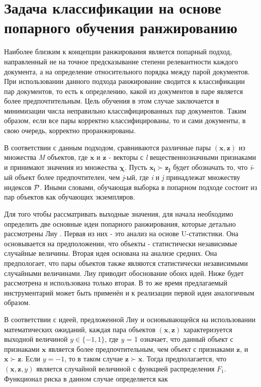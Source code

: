 \documentclass[12pt,a4paper,oneside]{article}
\begin{document}
\section{Задача классификации на основе попарного обучения ранжированию}
\label{sec:pairwise_rank_learning_problem}

\par
Наиболее близким к концепции ранжирования является попарный подход, направленный не на точное предсказывание степени релевантности каждого документа, а на определение относительного порядка между парой документов. 
При использовании данного подхода ранжирование сводится к классификации пар документов, то есть к определению, какой из документов в паре является более предпочтительным.
Цель обучения в этом случае заключается в минимизации числа неправильно классифицированных пар документов. 
Таким образом, если все пары корректно классифицированы, то и сами документы, в свою очередь, корректно проранжированы. 

\par
В соответствии с данным подходом, сравниваются различные пары \((\mathbf{x},\mathbf{z})\) из множества \emph{M} объектов, где \(\mathbf{x}\) и \(\mathbf{z}\) - векторы с \emph{l} вещественнозначными признаками и принимают значения из множества \(\mathbf{\chi}\). 
Пусть \(\mathbf{x_i} \succ \mathbf{z_j}\) будет обозначать то, что \emph{i}-ый объект более предпочтителен, чем \emph{j}-ый, где \emph{i} и \emph{j} принадлежат множеству индексов \(\mathcal{P}\). 
Иными словами, обучающая выборка в попарном подходе состоит из пар объектов как обучающих экземпляров. 

\par
Для того чтобы рассматривать выходные значения, для начала необходимо определить две основные идеи попарного ранжирования, которые детально рассмотрены Лиу .
Первая из них - это анализ на основе U-статистики.
Она основывается на предположении, что объекты - статистически независимые случайные величины.
Вторая идея основана на анализе средних. 
Она предпологает, что пары объектов также являются статистически независимыми случайными величинами. 
Лиу приводит обоснование обоих идей. 
Ниже будет рассмотрена и использована только вторая. 
В то же время предлагаемый инструментарий может быть применён и к реализации первой идеи аналогичным образом. 

\par
В соответствии с идеей, предложенной Лиу  и основывающейся на использовании математических ожиданий, каждая пара объектов \((\mathbf{x}, \mathbf{z})\) характеризуется выходной величиной \(y \in \{-1,1\}\), где \emph{y} = 1 означает, что данный объект с признаками \(\mathbf{x}\) является более предпочтительным, чем объект с признаками \(\mathbf{z}\), и \(\mathbf{x} \succ \mathbf{z}\). Если \(y = -1\), то в таком случае \(\mathbf{z} \succ \mathbf{x}\). Тогда предполагается, что \((\mathbf{x}, \mathbf{z}, y)\) является случайной величиной с функцией распределения \(F_1\). Функционал риска в данном случае определяется как
\end{document}
